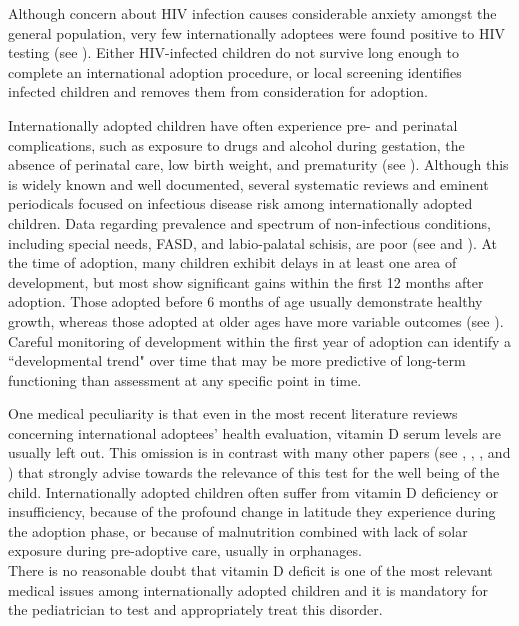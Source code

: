 Although concern about HIV infection causes considerable anxiety amongst the general population, very few internationally adoptees  were found positive to HIV testing (see \cite{caringfor}). Either HIV-infected children do not survive long enough to complete an international adoption procedure, or local screening identifies infected children and removes them from consideration for adoption.

Internationally adopted children have often experience pre- and perinatal complications, such as exposure to drugs and alcohol during gestation, the absence of perinatal care, low birth weight, and prematurity (see \cite{preventing}). Although this is widely known and well documented, several systematic reviews and eminent periodicals focused on infectious disease risk among internationally adopted children. Data regarding prevalence and spectrum of non-infectious conditions, including special needs, FASD, and labio-palatal schisis, are poor (see \cite{notonlyinfectious} and \cite{nonsoloinfezioni}). At the time of adoption, many children exhibit delays in at least one area of development, but most show significant gains within the first 12 months after adoption. Those adopted before 6 months of age usually demonstrate healthy growth, whereas those adopted at older ages have more variable outcomes (see \cite{nelson}). Careful monitoring of development within the first year of adoption can identify a ``developmental trend" over time that may be more predictive of long-term functioning than assessment at any specific point in time. 

One medical peculiarity is that even in the most recent literature reviews concerning international adoptees' health evaluation, vitamin D serum levels are usually left out. This omission is in contrast with many other papers (see \cite{vitDadopt1}, \cite{vitDadopt2}, \cite{vitDadopt3}, and \cite{vitDadopt4}) that strongly advise towards the relevance of this test for the well being of the child. Internationally adopted children often suffer from vitamin D deficiency or insufficiency, because of the profound change in latitude they experience during the adoption phase, or because of malnutrition combined with lack of solar exposure during pre-adoptive care, usually in orphanages.\\
There is no reasonable doubt that vitamin D deficit is one of the most relevant medical issues among internationally adopted children and it is mandatory for the pediatrician to test and appropriately treat this disorder.

